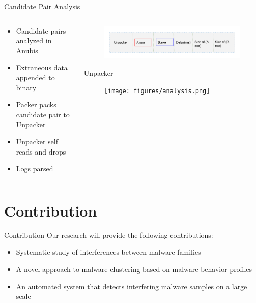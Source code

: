 \documentclass{beamer}
\begin{document}
\begin{frame}[plain]{Candidate Pair Analysis}
  \begin{columns}
    \begin{column}{5cm}
    \begin{itemize}
      \item Candidate pairs analyzed in Anubis
      \item Extraneous data appended to binary
      \item Packer packs candidate pair to Unpacker
      \item Unpacker self reads and drops
      \item Logs parsed
    \end{itemize}
    \end{column}
    \begin{column}{5cm}
      \begin{figure}[H]
        \centering
        \includegraphics[scale=0.26]{figures/unpacker.png}
      \label{fig:unpacker}
      \end{figure}
      \tiny \centering Unpacker
      \begin{figure}[h]
        \centering
        \texttt{[image: figures/analysis.png]}
      \end{figure}
    \end{column}
  \end{columns}
\end{frame}


\section{Contribution}
\begin{frame}[t]{Contribution}
Our research will provide the following contributions:
\begin{itemize}
  \item Systematic study of interferences between malware families
  \item A novel approach to malware clustering based on malware behavior profiles
  \item An automated system that detects interfering malware samples on a large scale
\end{itemize}
\end{frame}
\end{document}
